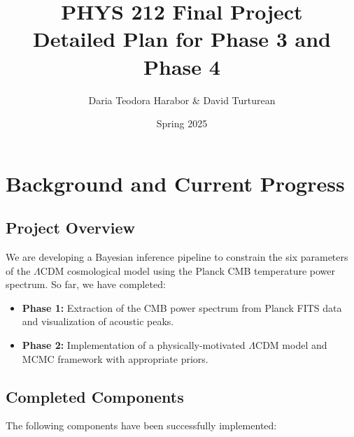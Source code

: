 \documentclass[11pt]{article}
\title{PHYS 212 Final Project\\
\Large Detailed Plan for Phase 3 and Phase 4}
\author{Daria Teodora Harabor \& David Turturean}
\date{Spring 2025}
\begin{document}
\maketitle

\section{Background and Current Progress}

\subsection{Project Overview}
We are developing a Bayesian inference pipeline to constrain the six parameters of the $\Lambda$CDM cosmological model using the Planck CMB temperature power spectrum. So far, we have completed:

\begin{itemize}
    \item \textbf{Phase 1:} Extraction of the CMB power spectrum from Planck FITS data and visualization of acoustic peaks.
    \item \textbf{Phase 2:} Implementation of a physically-motivated $\Lambda$CDM model and MCMC framework with appropriate priors.
\end{itemize}

\subsection{Completed Components}
The following components have been successfully implemented:
\end{document}
